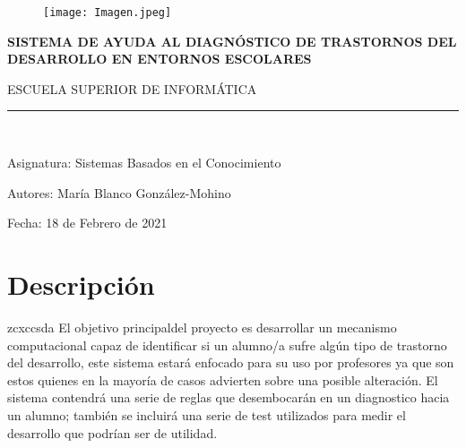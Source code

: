 \documentclass[letterpaper,12pt]{article}
\begin{document}
	
	\begin{titlepage}
		
		\begin{center}
			\vspace*{-1in}
			\begin{figure}[htb]
				\begin{center}
					\texttt{[image: Imagen.jpeg]}
				\end{center}
			\end{figure}
		
			\vspace*{0.15in}
			\begin{Large}
				\begin{center}
					\textbf{SISTEMA DE AYUDA AL DIAGNÓSTICO DE
TRASTORNOS DEL DESARROLLO EN
ENTORNOS ESCOLARES}
				\end{center}
			\end{Large}
			\vspace*{0.3in}
			\begin{large}
				ESCUELA SUPERIOR DE INFORMÁTICA\\
			\end{large}
			\vspace*{0.3in}
			\rule{150mm}{0.1mm}\\
			\vspace*{0.6in}
			\begin{large}
				\begin{flushleft}
					{\normalsize Asignatura: Sistemas Basados en el Conocimiento}
				\end{flushleft}
				\begin{flushleft}
					{\normalsize Autores: María Blanco González-Mohino\\} 
				\end{flushleft}
				\begin{flushleft}
					{\normalsize Fecha: 18 de Febrero de 2021}
				\end{flushleft}
			\end{large}
		\end{center}
		\end{titlepage}
		\tableofcontents
		\newpage
		\section{Descripción}
		zcxccsda
		El objetivo principaldel proyecto es desarrollar un mecanismo computacional capaz de identificar si un alumno/a sufre algún tipo de trastorno del desarrollo, este sistema estará enfocado para su uso por profesores ya que son estos quienes en la mayoría de casos advierten sobre una posible alteración.
El sistema contendrá una serie de reglas que desembocarán en un diagnostico hacia un alumno; también se incluirá una serie de test utilizados para medir el desarrollo que podrían ser de utilidad.
\end{document}
